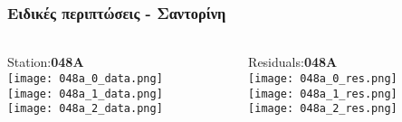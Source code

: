 \begin{frame}
  \frametitle{Ειδικές περιπτώσεις - Σαντορίνη}
  \framesubtitle{}
  \label{}
  \vskip-1cm
  \begin{columns}[T]
    \begin{column}{.33\textwidth}
      \begin{center}
      Station:\textbf{048A}\\
         \texttt{[image: 048a\_0\_data.png]}\\
         \texttt{[image: 048a\_1\_data.png]}\\
         \texttt{[image: 048a\_2\_data.png]}
       \end{center} 
    \end{column}
    \begin{column}{.33\textwidth}
      \begin{center}
      Residuals:\textbf{048A}\\
         \texttt{[image: 048a\_0\_res.png]}\\
         \texttt{[image: 048a\_1\_res.png]}\\
         \texttt{[image: 048a\_2\_res.png]}
       \end{center} 
      
    \end{column}
  \end{columns}
\end{frame}
\note{}


